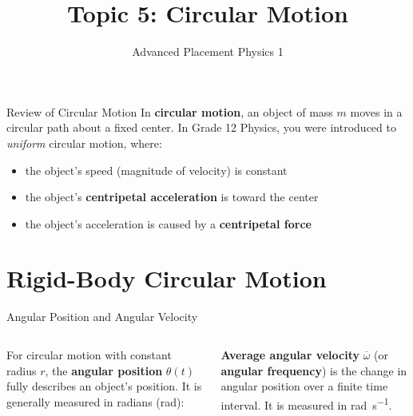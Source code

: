 \documentclass[12pt,compress,aspectratio=169]{beamer}
\title{Topic 5: Circular Motion}
\subtitle{Advanced Placement Physics 1}
\begin{document}
\begin{frame}
  \maketitle
\end{frame}


\begin{frame}{Review of Circular Motion}
  In \textbf{circular motion}, an object of mass $m$ moves in a circular path
  about a fixed center. In Grade 12 Physics, you were introduced to
  \emph{uniform} circular motion, where:
  \begin{itemize}
  \item the object's speed (magnitude of velocity) is constant
  \item the object's \textbf{centripetal acceleration} is toward the center
  \item the object's acceleration is caused by a \textbf{centripetal force}
  \end{itemize}
\end{frame}



\section{Rigid-Body Circular Motion}

\begin{frame}{Angular Position and Angular Velocity}
  \vspace{.2in}
  \begin{columns}
    
    For circular motion with constant radius $r$, the \textbf{angular position}
    $\theta(t)$ fully describes an object's position. It is generally measured
    in radians (rad):
      
    
    \textbf{Average angular velocity} $\overline\omega$ (or
    \textbf{angular frequency}) is the change in angular position over a finite
    time interval. It is measured in \si{rad\per\second}.
    

  \end{columns}
\end{frame}
\end{document}

